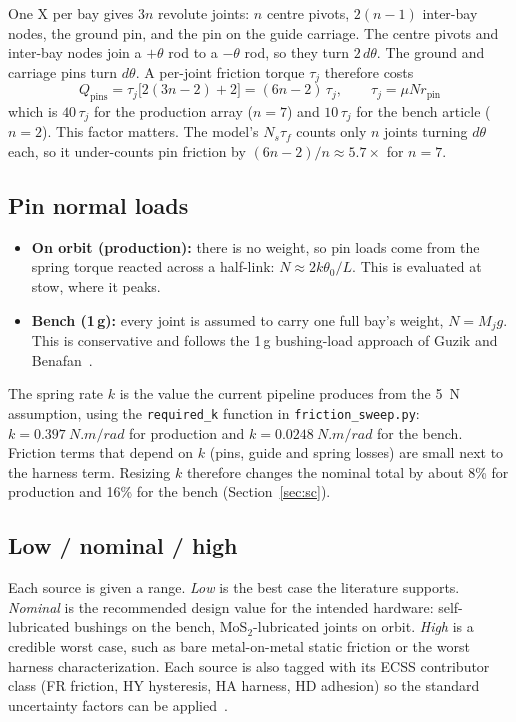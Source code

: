 \documentclass[11pt]{article}
\begin{document}
One X per bay gives $3n$ revolute joints: $n$ centre pivots, $2(n-1)$ inter-bay nodes, the ground pin, and
the pin on the guide carriage. The centre pivots and inter-bay nodes join a $+\theta$ rod to a $-\theta$
rod, so they turn $2\,d\theta$. The ground and carriage pins turn $d\theta$. A per-joint friction torque
$\tau_j$ therefore costs
\begin{equation}
Q_{\text{pins}} = \tau_j\big[2(3n-2) + 2\big] = (6n-2)\,\tau_j ,
\qquad \tau_j = \mu N r_{\text{pin}}
\label{eq:pins}
\end{equation}
which is $40\,\tau_j$ for the production array ($n=7$) and $10\,\tau_j$ for the bench article ($n=2$). This
factor matters. The model's $N_s\tau_f$ counts only $n$ joints turning $d\theta$ each, so it under-counts
pin friction by $(6n-2)/n \approx 5.7\times$ for $n=7$.

\subsection*{Pin normal loads}

\begin{itemize}[nosep]
    \item \textbf{On orbit (production):} there is no weight, so pin loads come from the spring torque
    reacted across a half-link: $N \approx 2k\theta_0/L$. This is evaluated at stow, where it peaks.
    \item \textbf{Bench (1\,g):} every joint is assumed to carry one full bay's weight, $N = M_j g$. This is
    conservative and follows the 1\,g bushing-load approach of Guzik and Benafan~\cite{guzik}.
\end{itemize}

The spring rate $k$ is the value the current pipeline produces from the \SI{5}{N} assumption, using the
\texttt{required\_k} function in \texttt{friction\_sweep.py}: $k=\SI{0.397}{N.m/rad}$ for production and
$k=\SI{0.0248}{N.m/rad}$ for the bench. Friction terms that depend on $k$ (pins, guide and spring losses) are
small next to the harness term. Resizing $k$ therefore changes the nominal total by about 8\% for production
and 16\% for the bench (Section~\ref{sec:sc}).

\subsection*{Low / nominal / high}

Each source is given a range. \emph{Low} is the best case the literature supports. \emph{Nominal} is the
recommended design value for the intended hardware: self-lubricated bushings on the bench, MoS$_2$-lubricated
joints on orbit. \emph{High} is a credible worst case, such as bare metal-on-metal static friction or the
worst harness characterization. Each source is also tagged with its ECSS contributor class (FR friction,
HY hysteresis, HA harness, HD adhesion) so the standard uncertainty factors can be applied~\cite{ecss}.
\end{document}
